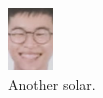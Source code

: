 \documentclass{article}
\begin{document}
\begin{figure}[ht!]
\begin{subfigure}[b]{0.3\linewidth}
\includegraphics[width=\linewidth]{images/solar.png}
\caption{Another solar.}
\end{subfigure}
\begin{subfigure}[b]{0.3\linewidth}

\end{subfigure}
\end{figure}
\end{document}
